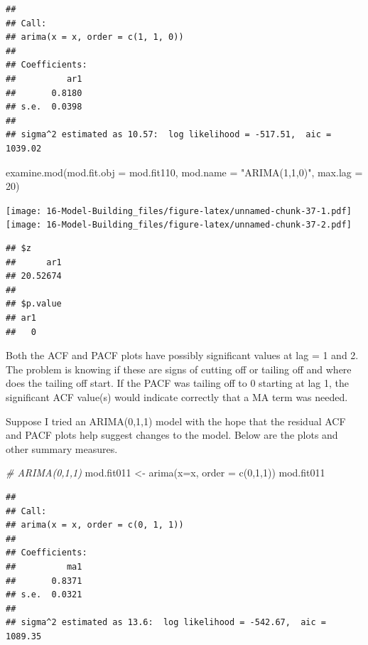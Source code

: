 \documentclass[
]{book}
\newenvironment{Shaded}{\begin{snugshade}}{\end{snugshade}}
\newcommand{\AttributeTok}[1]{\textcolor[rgb]{0.77,0.63,0.00}{#1}}
\newcommand{\CommentTok}[1]{\textcolor[rgb]{0.56,0.35,0.01}{\textit{#1}}}
\newcommand{\DecValTok}[1]{\textcolor[rgb]{0.00,0.00,0.81}{#1}}
\newcommand{\FunctionTok}[1]{\textcolor[rgb]{0.00,0.00,0.00}{#1}}
\newcommand{\NormalTok}[1]{#1}
\newcommand{\OtherTok}[1]{\textcolor[rgb]{0.56,0.35,0.01}{#1}}
\newcommand{\StringTok}[1]{\textcolor[rgb]{0.31,0.60,0.02}{#1}}
\theoremstyle{definition}
\theoremstyle{definition}
\theoremstyle{definition}
\theoremstyle{definition}
\theoremstyle{remark}
\begin{document}
\begin{verbatim}
## 
## Call:
## arima(x = x, order = c(1, 1, 0))
## 
## Coefficients:
##          ar1
##       0.8180
## s.e.  0.0398
## 
## sigma^2 estimated as 10.57:  log likelihood = -517.51,  aic = 1039.02
\end{verbatim}

\begin{Shaded}
\begin{Highlighting}[]
\FunctionTok{examine.mod}\NormalTok{(}\AttributeTok{mod.fit.obj =}\NormalTok{ mod.fit110, }\AttributeTok{mod.name =} 
    \StringTok{"ARIMA(1,1,0)"}\NormalTok{, }\AttributeTok{max.lag =} \DecValTok{20}\NormalTok{)}
\end{Highlighting}
\end{Shaded}

\texttt{[image: 16-Model-Building\_files/figure-latex/unnamed-chunk-37-1.pdf]} \texttt{[image: 16-Model-Building\_files/figure-latex/unnamed-chunk-37-2.pdf]}

\begin{verbatim}
## $z
##      ar1 
## 20.52674 
## 
## $p.value
## ar1 
##   0
\end{verbatim}

Both the ACF and PACF plots have possibly significant values at lag = 1 and 2. The problem is knowing if these are signs of cutting off or tailing off and where does the tailing off start. If the PACF was tailing off to 0 starting at lag 1, the significant ACF value(s) would indicate correctly that a MA term was needed.

Suppose I tried an ARIMA(0,1,1) model with the hope that the residual ACF and PACF plots help suggest changes to the model. Below are the plots and other summary measures.

\begin{Shaded}
\begin{Highlighting}[]
\CommentTok{\# ARIMA(0,1,1)}
\NormalTok{mod.fit011 }\OtherTok{\textless{}{-}} \FunctionTok{arima}\NormalTok{(}\AttributeTok{x=}\NormalTok{x, }\AttributeTok{order =} \FunctionTok{c}\NormalTok{(}\DecValTok{0}\NormalTok{,}\DecValTok{1}\NormalTok{,}\DecValTok{1}\NormalTok{))}
\NormalTok{mod.fit011}
\end{Highlighting}
\end{Shaded}

\begin{verbatim}
## 
## Call:
## arima(x = x, order = c(0, 1, 1))
## 
## Coefficients:
##          ma1
##       0.8371
## s.e.  0.0321
## 
## sigma^2 estimated as 13.6:  log likelihood = -542.67,  aic = 1089.35
\end{verbatim}
\end{document}
